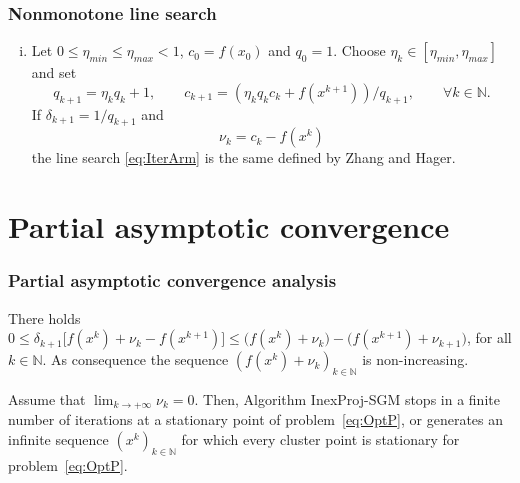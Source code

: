 \documentclass[xcolor=dvipsnames,aspectratio=169,13pt]{beamer} %
\begin{document}
\begin{frame}[t]\frametitle{Nonmonotone line search}
  \begin{block}{}
    \begin{enumerate}[(iii)]
      \item Let   $0\leq \eta_{min}\leq \eta_{max}<1$,   $c_0 = f(x_0)$ and  $q_0 = 1$. Choose $\eta_k\in [\eta_{min},  \eta_{max}]$ and set
            \begin{equation*}
              q_{k+1}=\eta_kq_{k}+1, \qquad c_{k+1} = (\eta_k q_k c_k + f(x^{k+1}))/q_{k+1}, \qquad \forall k \in \mathbb{N}.
            \end{equation*}
            If $\delta_{k+1}=1/q_{k+1}$ and
            \begin{equation}\label{eq:nuZH}
              \nu_{k}=c_k-f(x^k)
            \end{equation}
            the line search \eqref{eq:IterArm} is the same defined by Zhang and Hager.
    \end{enumerate}
  \end{block}
\end{frame}



\section{Partial asymptotic convergence}


\begin{frame}[t]\frametitle{Partial asymptotic convergence analysis}
  \begin{lemma}
    There holds  $0\leq \delta_{k+1}\Big[ f(x^{k})+\nu_{k}-  f(x^{k+1})\Big] \leq \Big( f(x^{k})+\nu_{k}\Big) - \Big( f(x^{k+1})+\nu_{k+1}\Big)$, for all $k \in \mathbb{N}$. As consequence the sequence   $\left(f(x^k)+\nu_k\right)_{k\in\mathbb{N}}$ is    non-increasing.
  \end{lemma}

  \bigskip
  \bigskip



  \begin{theorem} 
    Assume that $\displaystyle\lim_{k\to +\infty} \nu_{k} = 0$.   Then, Algorithm InexProj-SGM stops in a finite number of iterations at a stationary point of problem~\eqref{eq:OptP}, or generates an infinite sequence $(x^k)_{k\in\mathbb{N}}$ for which every cluster point is stationary for problem~\eqref{eq:OptP}.
  \end{theorem}
\end{frame}
\end{document}
